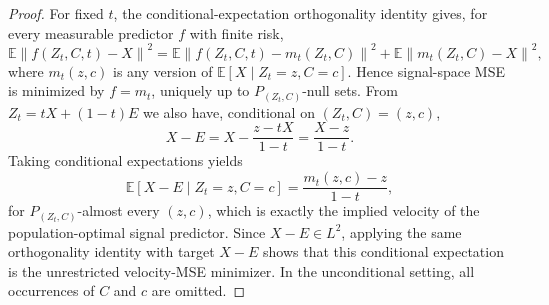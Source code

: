 \documentclass[10pt,a4paper]{amsart}
\newcommand{\Ex}{\mathbb{E}}
\newcommand{\norm}[1]{\left\lVert #1\right\rVert}
\begin{document}
\begin{proof}
For fixed $t$, the conditional-expectation orthogonality identity gives, for every measurable predictor $f$ with finite risk,
\begin{equation}
\Ex\norm{f(Z_t,C,t)-X}^2
=\Ex\norm{f(Z_t,C,t)-m_t(Z_t,C)}^2
+\Ex\norm{m_t(Z_t,C)-X}^2,
\end{equation}
where $m_t(z,c)$ is any version of $\Ex[X\mid Z_t=z,C=c]$. Hence signal-space MSE is minimized by $f=m_t$, uniquely up to $P_{(Z_t,C)}$-null sets. From $Z_t=tX+(1-t)E$ we also have, conditional on $(Z_t,C)=(z,c)$,
\begin{equation}
X-E=X-\frac{z-tX}{1-t}=\frac{X-z}{1-t}.
\end{equation}
Taking conditional expectations yields
\begin{equation}
\Ex[X-E\mid Z_t=z,C=c]=\frac{m_t(z,c)-z}{1-t},
\end{equation}
for $P_{(Z_t,C)}$-almost every $(z,c)$, which is exactly the implied velocity of the population-optimal signal predictor. Since $X-E\in L^2$, applying the same orthogonality identity with target $X-E$ shows that this conditional expectation is the unrestricted velocity-MSE minimizer. In the unconditional setting, all occurrences of $C$ and $c$ are omitted.
\end{proof}
\end{document}
